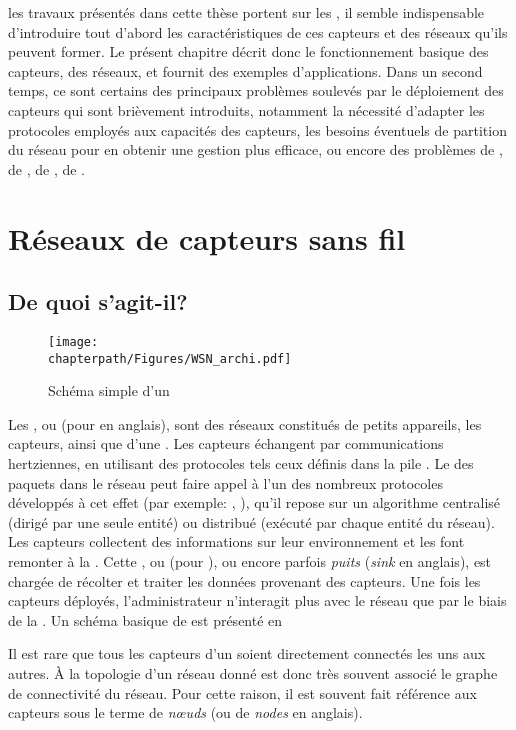  les travaux présentés dans cette thèse portent sur les \rcsfs, il semble indispensable d'introduire tout d'abord les caractéristiques de ces capteurs et des réseaux qu'ils peuvent former.
Le présent chapitre décrit donc le fonctionnement basique des capteurs, des réseaux, et fournit des exemples d'applications.
Dans un second temps, ce sont certains des principaux problèmes soulevés par le déploiement des capteurs qui sont brièvement introduits, notamment la nécessité d'adapter les protocoles employés aux capacités des capteurs, les besoins éventuels de partition du réseau pour en obtenir une gestion plus efficace, ou encore des problèmes de , de , de \secu, de \resilience.

\section{Réseaux de capteurs sans fil}

    \subsection{De quoi s'agit-il?}
\begin{figure}[!ht]
    \centering
    \texttt{[image: \\chapterpath/Figures/WSN\_archi.pdf]}
    \caption{Schéma simple d'un \rcsf}\label{st:fig:wsnintro}
\end{figure}
Les \rcsfs, ou \textit{\WSN} (pour \wsns en anglais), sont des réseaux constitués de petits appareils, les capteurs, ainsi que d'une \sdb.
Les capteurs échangent par communications hertziennes, en utilisant des protocoles tels ceux définis dans la pile \ieeee.
Le  des paquets dans le réseau peut faire appel à l'un des nombreux protocoles développés à cet effet (par exemple: \aodv, \olsr), qu'il repose sur un algorithme centralisé (dirigé par une seule entité) ou distribué (exécuté par chaque entité du réseau).
Les capteurs collectent des informations sur leur environnement et les font remonter à la \sdb.
Cette \sdb, ou \BS (pour \bs), ou encore parfois \textit{puits} (\textit{sink} en anglais), est chargée de récolter et traiter les données provenant des capteurs.
Une fois les capteurs déployés, l'administrateur n'interagit plus avec le réseau que par le biais de la \sdb.
Un schéma basique de \rcsf est présenté en 

Il est rare que tous les capteurs d'un \WSN soient directement connectés les uns aux autres.
À la topologie d'un réseau donné est donc très souvent associé le graphe de connectivité du réseau.
Pour cette raison, il est souvent fait référence aux capteurs sous le terme de \textit{nœuds} (ou de \textit{nodes} en anglais).

